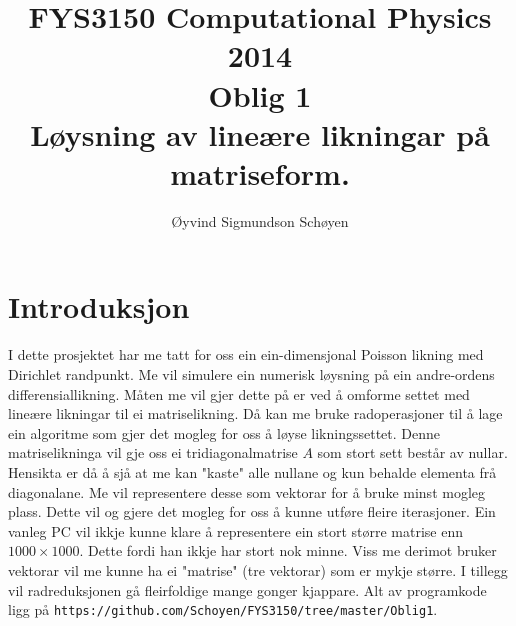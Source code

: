 \documentclass[11pt, a4paper]{article}
\begin{document}
\begin{titlepage}

  \title{\normalsize FYS3150 Computational Physics 2014\\
  \vspace{10mm}
  \huge Oblig 1\\
  \vspace{10mm}
  \normalsize {\bf Løysning av lineære likningar på matriseform.}}

  \author{Øyvind Sigmundson Schøyen}

\end{titlepage}
\maketitle

\newpage
  \tableofcontents
\newpage

\section{Introduksjon}
  I dette prosjektet har me tatt for oss ein ein-dimensjonal Poisson likning med Dirichlet randpunkt.
  Me vil simulere ein numerisk løysning på ein andre-ordens differensiallikning.
  Måten me vil gjer dette på er ved å omforme settet med lineære likningar til ei matriselikning. Då 
  kan me bruke radoperasjoner til å lage ein algoritme som gjer det mogleg for oss å løyse 
  likningssettet. Denne matriselikninga vil gje oss ei tridiagonalmatrise $A$ som stort sett består av  nullar. Hensikta er då å sjå at me kan "kaste" alle nullane og kun behalde elementa frå diagonalane.
  Me vil representere desse som vektorar for å bruke minst mogleg plass. Dette vil og gjere det mogleg  for oss å kunne utføre fleire iterasjoner. Ein vanleg PC vil ikkje kunne klare å representere ein 
  stort større matrise enn $1000\times1000$. Dette fordi han ikkje har stort nok minne. Viss me 
  derimot bruker vektorar vil me kunne ha ei "matrise" (tre vektorar) som er mykje større. I tillegg 
  vil radreduksjonen gå fleirfoldige mange gonger kjappare.
  Alt av programkode ligg på \texttt{https://github.com/Schoyen/FYS3150/tree/master/Oblig1}.
\end{document}
